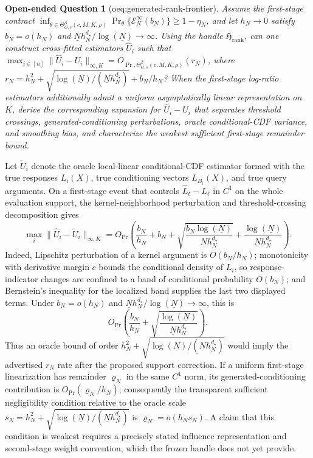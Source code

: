 \documentclass{article}
\newtheorem{openendedquestion}{Open-ended Question}
\begin{document}
\begin{openendedquestion}[oeq:generated-rank-frontier]\label{oeq:generated-rank-frontier}
Assume the first-stage contract \(\inf_{\theta\in\Theta^{\beta}_{G,s}(c,M,K,\rho)}\Pr_\theta\{\mathcal E_N^{\infty}(b_N)\}\ge1-\eta_N\), and let \(h_N\to0\) satisfy \(b_N=o(h_N)\) and \(\underline N h_N^{d_\star}/\log(\underline N)\to\infty\). Using the handle \(\mathfrak H_{\mathrm{rank}}\), can one construct cross-fitted estimators \(\widehat U_i\) such that \(\max_{i\in[n]}\|\widehat U_i-U_i\|_{\infty,K}=O_{\Pr,\Theta^{\beta}_{G,s}(c,M,K,\rho)}(r_N)\), where \(r_N=h_N^2+\sqrt{\log(\underline N)/(\underline N h_N^{d_\star})}+b_N/h_N\)? When the first-stage log-ratio estimators additionally admit a uniform asymptotically linear representation on \(K\), derive the corresponding expansion for \(\widehat U_i-U_i\) that separates threshold crossings, generated-conditioning perturbations, oracle conditional-CDF variance, and smoothing bias, and characterize the weakest sufficient first-stage remainder bound.
\end{openendedquestion}
Let \(\widetilde U_i\) denote the oracle local-linear conditional-CDF estimator formed with the true responses \(L_i(X)\), true conditioning vectors \(L_{B_i}(X)\), and true query arguments.  On a first-stage event that controls \(\widehat L_\ell-L_\ell\) in \(C^1\) on the whole evaluation support, the kernel-neighborhood perturbation and threshold-crossing decomposition gives
\[
 \max_i\|\widehat U_i-\widetilde U_i\|_{\infty,K}
 =O_{\Pr}\!\left(
 \frac{b_N}{h_N}+b_N+\sqrt{\frac{b_N\log(\underline N)}{\underline N h_N^{d_\star}}}
 +\frac{\log(\underline N)}{\underline N h_N^{d_\star}}
 \right).
\]
Indeed, Lipschitz perturbation of a kernel argument is \(O(b_N/h_N)\); monotonicity with derivative margin \(c\) bounds the conditional density of \(L_i\), so response-indicator changes are confined to a band of conditional probability \(O(b_N)\); and Bernstein's inequality for the localized band supplies the last two displayed terms.  Under \(b_N=o(h_N)\) and \(\underline N h_N^{d_\star}/\log(\underline N)\to\infty\), this is
\[
 O_{\Pr}\!\left(\frac{b_N}{h_N}
 +\sqrt{\frac{\log(\underline N)}{\underline N h_N^{d_\star}}}\right).
\]
Thus an oracle bound of order \(h_N^2+\sqrt{\log(\underline N)/(\underline N h_N^{d_\star})}\) would imply the advertised \(r_N\) rate after the proposed support correction.  If a uniform first-stage linearization has remainder \(\varrho_N\) in the same \(C^1\) norm, its generated-conditioning contribution is \(O_{\Pr}(\varrho_N/h_N)\); consequently the transparent sufficient negligibility condition relative to the oracle scale \(s_N=h_N^2+\sqrt{\log(\underline N)/(\underline N h_N^{d_\star})}\) is \(\varrho_N=o(h_Ns_N)\).  A claim that this condition is weakest requires a precisely stated influence representation and second-stage weight convention, which the frozen handle does not yet provide.
\end{document}
